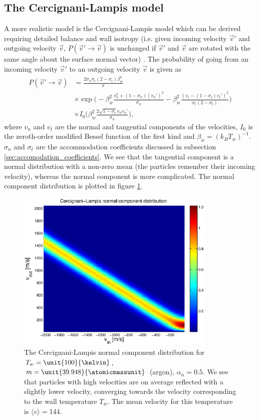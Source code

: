 \subsection{The Cercignani-Lampis model}
A more realistic model is the Cercignani-Lampis model which can be derived requiring detailed balance and wall isotropy (i.e. given incoming velocity $\vec v'$ and outgoing velocity $\vec v$, $P(\vec v' \rightarrow \vec v)$ is unchanged if $\vec v'$ and $\vec v$ are rotated with the same angle about the surface normal vector) \cite{cowling1974cercignani}. The probability of going from an incoming velocity $\vec v'$ to an outgoing velocity $\vec v$ is given as
\begin{align}
	\nonumber
	P(\vec v'\rightarrow \vec v) &= \frac{2\sigma_n\sigma_t(2-\sigma_t)\beta_w^4}{\pi}\\
	\nonumber
	&\times\exp\Big(-\beta_w^2\frac{v_n^2 + (1-\sigma_n)(v_n')^2}{\sigma_n} - \beta_w^2\frac{(v_t - (1 - \sigma_t)v_t')^2}{\sigma_t(2 - \sigma_t)}\Big)\\
	&\times I_0\Big(\beta_w^2\frac{2\sqrt{1 - \sigma_t}v_nv_n'}{\sigma_n}\Big),
\end{align}
where $v_n$ and $v_t$ are the normal and tangential components of the velocities, $I_0$ is the zeroth-order modified Bessel function of the first kind and $\beta_w = (k_BT_w)^{-1}$. $\sigma_n$ and $\sigma_t$ are the accommodation coefficients discussed in subsection \ref{sec:accomodation_coefficients}. We see that the tangential component is a normal distribution with a non-zero mean (the particles remember their incoming velocity), whereas the normal component is more complicated. The normal component distribution is plotted in figure \ref{fig:cercignani_lampis}.
\begin{figure}[h]
\begin{center}
\includegraphics[width=0.85\textwidth, trim=0cm 0cm 0cm 0cm, clip]{DSMC/figures/cercignani-lampis.eps}
\end{center}
\caption{The Cercignani-Lampis normal component distribution for $T_w=\unit{100}{\kelvin}$, $m=\unit{39.948}{\atomicmassunit}$ (argon), $\alpha_n=0.5$. We see that particles with high velocities are on average reflected with a slightly lower velocity, converging towards the velocity corresponding to the wall temperature $T_w$. The mean velocity for this temperature is $\langle v \rangle = $\unit{144}{\meter\per\second}.}
\label{fig:cercignani_lampis}
\end{figure}
